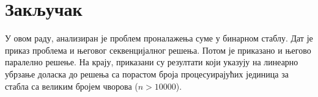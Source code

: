 \section{Закључак}

У овом раду, анализиран је проблем проналажења суме у бинарном стаблу.
Дат је приказ проблема и његовог секвенцијалног решења.
Потом је приказано и његово паралелно решење.
На крају, приказани су резултати који указују на линеарно убрзање доласка до решења са порастом броја процесуирајућих јединица за стабла са великим бројем чворова ($n > 10 000$).